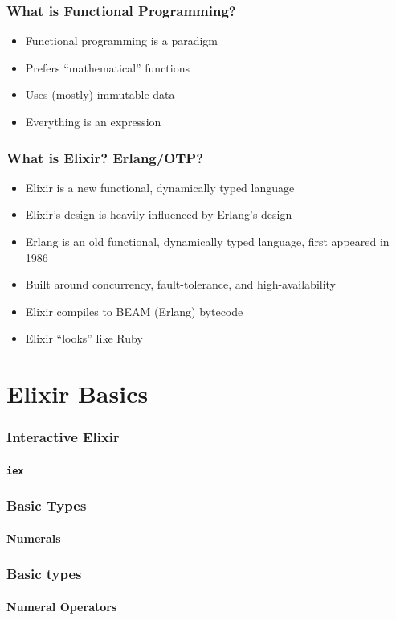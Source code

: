 \documentclass[english]{beamer}
\begin{document}
\begin{frame}
\frametitle{What is Functional Programming?}
\begin{itemize}
\item<1->{Functional programming is a paradigm} %
\item<2->{Prefers ``mathematical'' functions}
\item<3->{Uses (mostly) immutable data} %
\item<4->{Everything is an expression}
\end{itemize}
\end{frame}

\begin{frame}
\frametitle{What is Elixir? Erlang/OTP?}
\begin{itemize}
\item{Elixir is a new functional, dynamically typed language}
\item{Elixir's design is heavily influenced by Erlang's design}
\item{Erlang is an old functional, dynamically typed language, first appeared
in 1986}
\item{Built around concurrency, fault-tolerance, and high-availability}
\item{Elixir compiles to BEAM (Erlang) bytecode}
\item{Elixir ``looks'' like Ruby} %
\end{itemize}
\end{frame}

\section{Elixir Basics}

\begin{frame}[fragile]
\frametitle{Interactive Elixir}
\framesubtitle{\texttt{iex}}

\end{frame}

\begin{frame}[fragile]
\frametitle{Basic Types}
\framesubtitle{Numerals}

\end{frame}

\begin{frame}[fragile]
\frametitle{Basic types}
\framesubtitle{Numeral Operators}

\end{frame}
\end{document}
